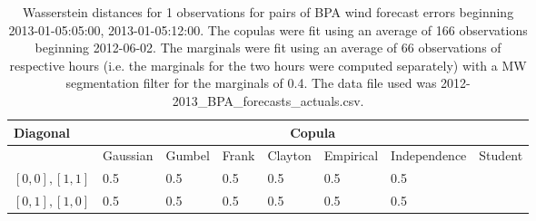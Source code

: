 \begin{table}[h] 
    \centering 
    \begin{tabular}{|l|l|l|l|l|l|l|l|} \hline 
        \textbf{Diagonal} & \multicolumn{7}{c|}{\textbf{Copula}} \\ \hline 
        & Gaussian & Gumbel & Frank & Clayton & Empirical & Independence & Student \\ \hline 
        $[0,0], [1,1]$ & 0.5 & 0.5 & 0.5 & 0.5 & 0.5 & 0.5 &  \\ \hline 
        $[0,1], [1,0]$ & 0.5 & 0.5 & 0.5 & 0.5 & 0.5 & 0.5 &  \\ \hline 
    \end{tabular} 
    \caption{Wasserstein distances for 1 observations for pairs of BPA wind forecast errors beginning 2013-01-05:05:00, 2013-01-05:12:00. The copulas were fit  using an average of 166 observations beginning 2012-06-02. The marginals were fit using an average of 66 observations of respective hours (i.e. the  marginals for the two hours were computed separately) with a MW segmentation filter for the marginals of 0.4. The data file used was 2012-2013\_BPA\_forecasts\_actuals.csv.} 
\end{table}